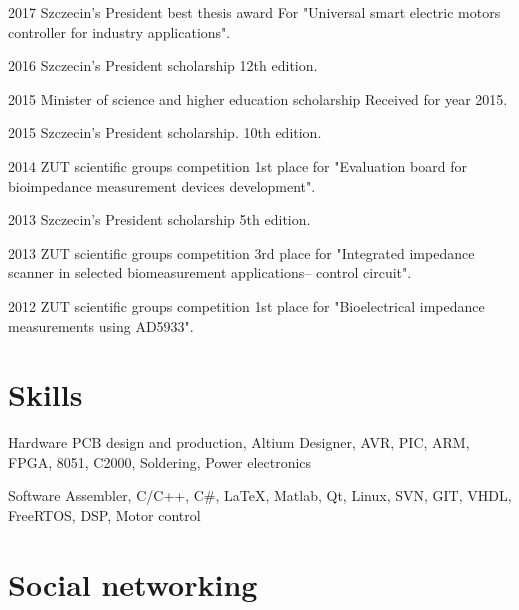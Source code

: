 \documentclass{tccv}
\begin{document}
\begin{yearlist}

\item{2017}
     {Szczecin's President best thesis award}
     {For "Universal smart electric motors controller for industry applications".} 

\item{2016}
     {Szczecin's President scholarship}
     {12th edition.} 
     
\item{2015}
     {Minister of science and higher education scholarship}
     {Received for year 2015.} 

\item{2015}
     {Szczecin's President scholarship.}
     {10th edition.} 

\item{2014}
     {ZUT scientific groups competition}
     {1st place for "{Evaluation board for bioimpedance measurement devices development}".}
     
\item{2013}
     {Szczecin's President scholarship}
     {5th edition.} 

\item{2013}
     {ZUT scientific groups competition}
     {3rd place for "Integrated impedance scanner in selected biomeasurement applications-- control circuit".}

\item{2012}
     {ZUT scientific groups competition}
     {1st place for "Bioelectrical impedance measurements using AD5933".}
    
\end{yearlist}

\section{Skills}

\begin{factlist}

\item{Hardware}
     {PCB design and production, Altium Designer, AVR, PIC, ARM, FPGA, 8051, C2000, Soldering, Power electronics}

\item{Software}
     {Assembler, C/C++, C\#, \LaTeX, Matlab, Qt, Linux, SVN, GIT, VHDL, FreeRTOS, DSP, Motor control}

\end{factlist}

\section{Social networking}
\end{document}
